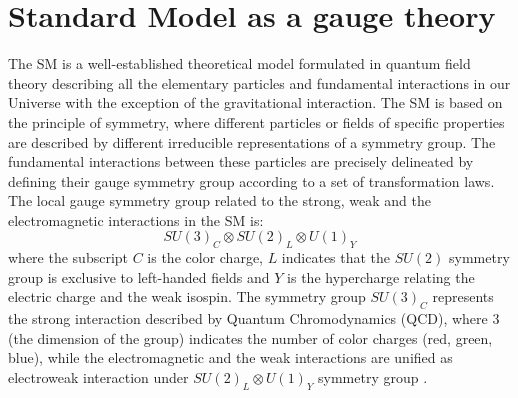 \section{\label{sec:intro_gauge}Standard Model as a gauge theory}%
\noindent The SM is a well-established theoretical model formulated in quantum field theory describing all the elementary particles and fundamental interactions in our Universe with the exception of the gravitational interaction. The SM is based on the  principle of symmetry, where different particles or fields of specific properties are described by different irreducible representations of a symmetry group. The fundamental interactions between these particles are precisely delineated by defining their gauge symmetry group according to a set of transformation laws. The local gauge symmetry group related to the strong, weak and the electromagnetic interactions in the SM is:
\begin{equation}
    SU(3)_C \otimes SU(2)_L \otimes U(1)_Y
\end{equation}
where the subscript $C$ is the color charge, $L$ indicates that the $SU(2)$ symmetry group is exclusive to left-handed fields and $Y$ is the hypercharge relating the electric charge and the weak isospin. The symmetry group $SU(3)_C$ represents the strong interaction described by Quantum Chromodynamics (QCD), where 3 (the dimension of the group) indicates the number of color charges (red, green, blue), while the electromagnetic and the weak interactions are unified as electroweak interaction under $SU(2)_L \otimes U(1)_Y$ symmetry group \cite{GLASHOW_Electroweak}.\\


